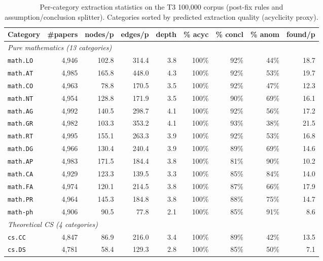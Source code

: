 \begin{table}[h]
\centering
\footnotesize
\caption{Per-category extraction statistics on the T3 100{,}000 corpus (post-fix rules and assumption/conclusion splitter). Categories sorted by predicted extraction quality (acyclicity proxy).}
\label{tab:cross-category}
\renewcommand{\arraystretch}{1.05}

\begin{tabular}{@{}lrrrrrrrr@{}}
\toprule
\textbf{Category} & \textbf{\#papers} & \textbf{nodes/p} & \textbf{edges/p} & \textbf{depth} & \textbf{\% acyc} & \textbf{\% concl} & \textbf{\% anom} & \textbf{found/p} \\
\midrule
\multicolumn{9}{l}{\textit{Pure mathematics (13 categories)}} \\
\texttt{math.LO} & 4{,}946 & 102.8 & 314.4 & 3.8 & 100\% & 92\% & 44\% & 18.7 \\
\texttt{math.AT} & 4{,}985 & 165.8 & 448.0 & 4.3 & 100\% & 92\% & 53\% & 19.7 \\
\texttt{math.CO} & 4{,}963 & 78.8 & 170.5 & 3.5 & 100\% & 92\% & 47\% & 12.3 \\
\texttt{math.NT} & 4{,}954 & 128.8 & 171.9 & 3.5 & 100\% & 90\% & 69\% & 16.1 \\
\texttt{math.AG} & 4{,}992 & 140.5 & 298.7 & 4.1 & 100\% & 92\% & 56\% & 17.2 \\
\texttt{math.GR} & 4{,}982 & 103.3 & 353.2 & 4.1 & 100\% & 93\% & 38\% & 21.5 \\
\texttt{math.RT} & 4{,}995 & 155.1 & 263.3 & 3.9 & 100\% & 92\% & 53\% & 16.8 \\
\texttt{math.DG} & 4{,}966 & 130.4 & 240.4 & 3.9 & 100\% & 89\% & 69\% & 14.6 \\
\texttt{math.AP} & 4{,}983 & 171.5 & 184.4 & 3.8 & 100\% & 81\% & 90\% & 10.2 \\
\texttt{math.CA} & 4{,}929 & 123.3 & 139.5 & 3.3 & 100\% & 85\% & 84\% & 14.0 \\
\texttt{math.FA} & 4{,}974 & 120.1 & 214.5 & 3.8 & 100\% & 87\% & 66\% & 17.9 \\
\texttt{math.PR} & 4{,}964 & 145.3 & 184.8 & 3.8 & 100\% & 88\% & 75\% & 14.7 \\
\texttt{math-ph} & 4{,}906 & 90.5 & 77.8 & 2.1 & 100\% & 85\% & 91\% & 8.6 \\
\midrule
\multicolumn{9}{l}{\textit{Theoretical CS (4 categories)}} \\
\texttt{cs.CC} & 4{,}847 & 86.9 & 216.0 & 3.4 & 100\% & 89\% & 42\% & 13.5 \\
\texttt{cs.DS} & 4{,}781 & 58.4 & 129.3 & 2.8 & 100\% & 85\% & 50\% & 7.1 \\

\end{tabular}
\end{table}
